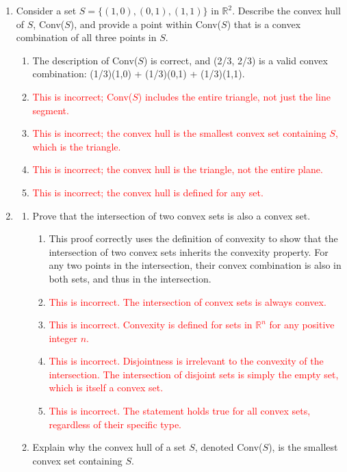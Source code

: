 \documentclass{article}%
\newcommand{\incorrect}[1]{\textcolor{red}{#1}}
\begin{document}
\begin{enumerate}
\item Consider a set $S = \{(1, 0), (0, 1), (1, 1)\}$ in $\mathbb{R}^2$.  Describe the convex hull of $S$, Conv($S$), and provide a point within Conv($S$) that is a convex combination of all three points in $S$.%
\begin{enumerate}%
\item The description of Conv($S$) is correct, and (2/3, 2/3) is a valid convex combination: (1/3)(1,0) + (1/3)(0,1) + (1/3)(1,1).%
\item \incorrect{This is incorrect; Conv($S$) includes the entire triangle, not just the line segment.}%
\item \incorrect{This is incorrect; the convex hull is the smallest convex set containing $S$, which is the triangle.}%
\item \incorrect{This is incorrect; the convex hull is the triangle, not the entire plane.}%
\item \incorrect{This is incorrect; the convex hull is defined for any set.}%
\end{enumerate}%
\vspace{1em}%
\item%
\begin{enumerate}%
\item Prove that the intersection of two convex sets is also a convex set.%
\begin{enumerate}%
\item This proof correctly uses the definition of convexity to show that the intersection of two convex sets inherits the convexity property.  For any two points in the intersection, their convex combination is also in both sets, and thus in the intersection.%
\item \incorrect{This is incorrect. The intersection of convex sets is always convex.}%
\item \incorrect{This is incorrect. Convexity is defined for sets in $\mathbb{R}^n$ for any positive integer $n$.}%
\item \incorrect{This is incorrect. Disjointness is irrelevant to the convexity of the intersection. The intersection of disjoint sets is simply the empty set, which is itself a convex set.}%
\item \incorrect{This is incorrect. The statement holds true for all convex sets, regardless of their specific type.}%
\end{enumerate}%
\vspace{0.5em}%
\item Explain why the convex hull of a set $S$, denoted Conv($S$), is the smallest convex set containing $S$.%

\end{enumerate}
\end{enumerate}
\end{document}
